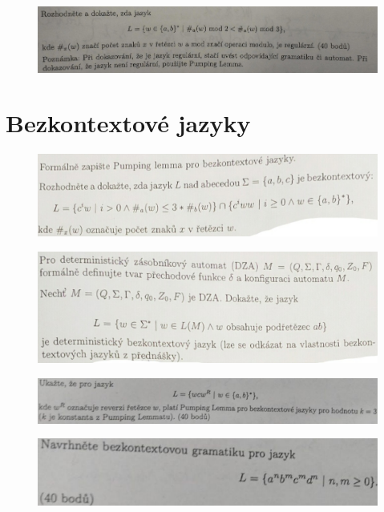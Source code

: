 \documentclass[]{article}
\begin{document}
	\begin{figure}[H]
		\includegraphics[width=\textwidth]{tasks/regularne/task9.png}
	\end{figure}

	\section{Bezkontextové jazyky}
	
	\begin{figure}[H]
		\includegraphics[width=\textwidth]{tasks/bezkontextove/task1.png}
	\end{figure}

	\begin{figure}[H]
		\includegraphics[width=\textwidth]{tasks/bezkontextove/task2.png}
	\end{figure}
	
	\begin{figure}[H]
		\includegraphics[width=\textwidth]{tasks/bezkontextove/task3.png}
	\end{figure}
	
	\begin{figure}[H]
		\includegraphics[width=\textwidth]{tasks/bezkontextove/task4.png}
	\end{figure}
	
\end{document}
